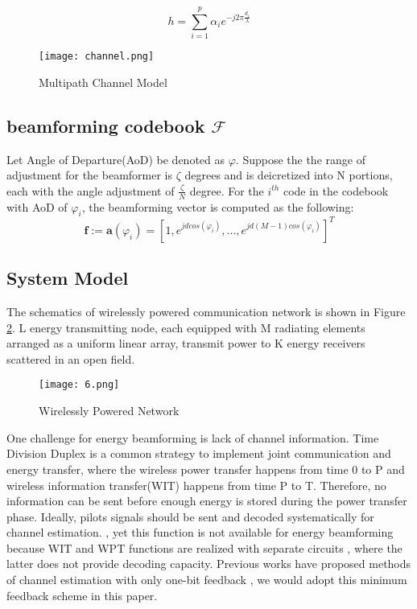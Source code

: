 \begin{equation}
h=\sum_{i=1}^p \alpha_i e^{-j2\pi \frac{d_i}{\lambda}}
\end{equation}

\begin{figure}
\centering
\texttt{[image: channel.png]}
\caption{Multipath Channel Model}
\label{fig:channel}
\end{figure}


\subsection{beamforming codebook $\mathcal{F}$}

Let Angle of Departure(AoD) be denoted as $\varphi$. Suppose the the range of adjustment for the beamformer is $\zeta$ degrees and is deicretized into N portions, each with the angle adjustment of $\frac{\zeta}{N}$ degree. For the $i^{th}$ code in the codebook with AoD of $\varphi_i$, the beamforming vector is computed as the following:
\begin{equation}
\textbf{f} := \textbf{a}(\varphi_i)= [1,e^{jdcos(\varphi_i)},...,e^{jd(M-1)cos(\varphi_i)}]^T
\end{equation}

\subsection{System Model}

The schematics of wirelessly powered communication network is shown in Figure \ref{fig:MIMO}. L energy transmitting node, each equipped with M radiating elements arranged as a uniform linear array, transmit power to K energy receivers scattered in an open field.

\begin{figure}
    \centering
    \texttt{[image: 6.png]}
    \caption{Wirelessly Powered Network}
    \label{fig:MIMO}
\end{figure}

One challenge for energy beamforming is lack of channel information. Time Division Duplex is a common strategy to implement joint communication and energy transfer, where the wireless power transfer happens from time 0 to P and wireless information transfer(WIT) happens from time P to T. Therefore, no information can be sent before enough energy is stored during the power transfer phase. Ideally, pilots signals should be sent and decoded systematically for channel estimation. \cite{1597555}, yet this function is not available for energy beamforming because WIT and WPT functions are realized with separate circuits \cite{7462480}, where the latter does not provide decoding capacity. Previous works have proposed methods of channel estimation with only one-bit feedback \cite{6884811}, we would adopt this minimum feedback scheme in this paper.


